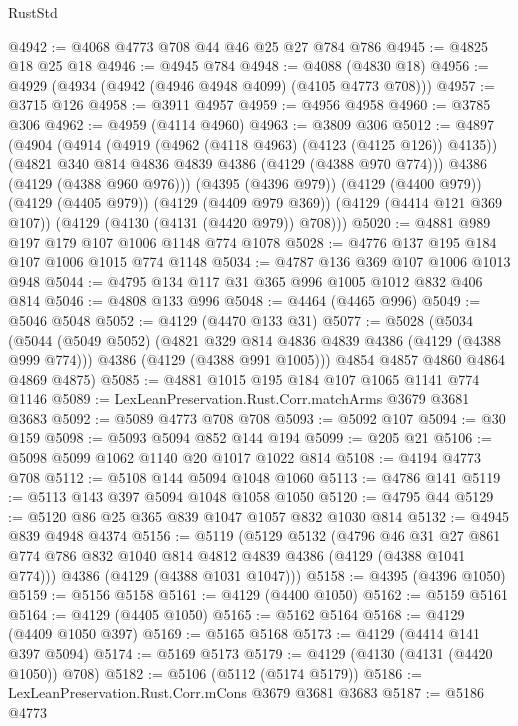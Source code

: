 \begin{lexlean}{RustStd}
\begin{coremodule}
@4942 := @4068 @4773 @708 @44 @46 @25 @27 @784 @786
@4945 := @4825 @18 @25 @18
@4946 := @4945 @784
@4948 := @4088 (@4830 @18)
@4956 := @4929 (@4934 (@4942 (@4946 @4948 @4099) (@4105 @4773 @708)))
@4957 := @3715 @126
@4958 := @3911 @4957
@4959 := @4956 @4958
@4960 := @3785 @306
@4962 := @4959 (@4114 @4960)
@4963 := @3809 @306
@5012 := @4897
    (@4904
      (@4914
        (@4919 (@4962 (@4118 @4963) (@4123 (@4125 @126)) @4135))
        (@4821 @340 @814 @4836 @4839 @4386 (@4129 (@4388 @970 @774)))
        @4386
        (@4129 (@4388 @960 @976)))
      (@4395 (@4396 @979))
      (@4129 (@4400 @979))
      (@4129 (@4405 @979))
      (@4129 (@4409 @979 @369))
      (@4129 (@4414 @121 @369 @107))
      (@4129 (@4130 (@4131 (@4420 @979)) @708)))
@5020 := @4881 @989 @197 @179 @107 @1006 @1148 @774 @1078
@5028 := @4776 @137 @195 @184 @107 @1006 @1015 @774 @1148
@5034 := @4787 @136 @369 @107 @1006 @1013 @948
@5044 := @4795 @134 @117 @31 @365 @996 @1005 @1012 @832 @406 @814
@5046 := @4808 @133 @996
@5048 := @4464 (@4465 @996)
@5049 := @5046 @5048
@5052 := @4129 (@4470 @133 @31)
@5077 := @5028
    (@5034
      (@5044
        (@5049 @5052)
        (@4821 @329 @814 @4836 @4839 @4386 (@4129 (@4388 @999 @774)))
        @4386
        (@4129 (@4388 @991 @1005)))
      @4854
      @4857
      @4860
      @4864
      @4869
      @4875)
@5085 := @4881 @1015 @195 @184 @107 @1065 @1141 @774 @1146
@5089 := LexLeanPreservation.Rust.Corr.matchArms @3679 @3681 @3683
@5092 := @5089 @4773 @708 @708
@5093 := @5092 @107
@5094 := @30 @159
@5098 := @5093 @5094 @852 @144 @194
@5099 := @205 @21
@5106 := @5098 @5099 @1062 @1140 @20 @1017 @1022 @814
@5108 := @4194 @4773 @708
@5112 := @5108 @144 @5094 @1048 @1060
@5113 := @4786 @141
@5119 := @5113 @143 @397 @5094 @1048 @1058 @1050
@5120 := @4795 @44
@5129 := @5120 @86 @25 @365 @839 @1047 @1057 @832 @1030 @814
@5132 := @4945 @839 @4948 @4374
@5156 := @5119
    (@5129
      @5132
      (@4796
        @46
        @31
        @27
        @861
        @774
        @786
        @832
        @1040
        @814
        @4812
        @4839
        @4386
        (@4129 (@4388 @1041 @774)))
      @4386
      (@4129 (@4388 @1031 @1047)))
@5158 := @4395 (@4396 @1050)
@5159 := @5156 @5158
@5161 := @4129 (@4400 @1050)
@5162 := @5159 @5161
@5164 := @4129 (@4405 @1050)
@5165 := @5162 @5164
@5168 := @4129 (@4409 @1050 @397)
@5169 := @5165 @5168
@5173 := @4129 (@4414 @141 @397 @5094)
@5174 := @5169 @5173
@5179 := @4129 (@4130 (@4131 (@4420 @1050)) @708)
@5182 := @5106 (@5112 (@5174 @5179))
@5186 := LexLeanPreservation.Rust.Corr.mCons @3679 @3681 @3683
@5187 := @5186 @4773

\end{coremodule}
\end{lexlean}
